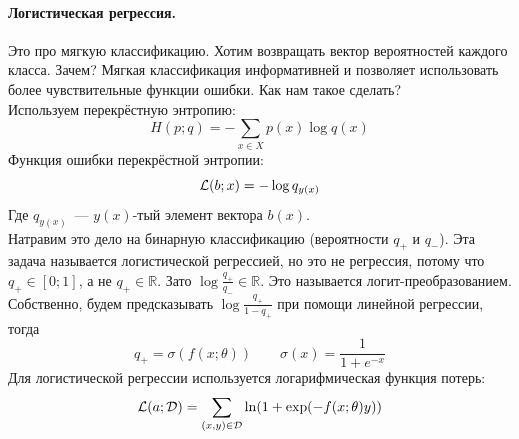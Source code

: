 \documentclass{article}
\begin{document}
    \paragraph{Логистическая регрессия.}
    Это про мягкую классификацию. Хотим возвращать вектор вероятностей каждого класса. Зачем? Мягкая классификация информативней и позволяет использовать более чувствительные функции ошибки. Как нам такое сделать?\\
    Используем перекрёстную энтропию:
    \[
    H(p;q)=-\sum\limits_{x\in X}p(x)\log q(x)
    \]
    Функция ошибки перекрёстной энтропии:
    \[
    {\mathcal{L}}(b;x)=-\log q_{y(x)}
    \]
    Где $q_{y(x)}$~--- $y(x)$-тый элемент вектора $b(x)$.\\
    Натравим это дело на бинарную классификацию (вероятности $q_+$ и $q_-$). Эта задача называется логистической регрессией, но это не регрессия, потому что $q_+\in[0;1]$, а не $q_+\in\mathbb R$. Зато $\log\frac{q_+}{q_-}\in\mathbb R$. Это называется логит-преобразованием.\\
    Собственно, будем предсказывать $\log\frac{q_+}{1-q_+}$ при помощи линейной регрессии, тогда
    \[
    q_+=\sigma(f(x;\theta))\qquad\sigma(x)=\frac1{1+e^{-x}}
    \]
    Для логистической регрессии используется логарифмическая функция потерь:
    \[
    {\mathcal{L}}(a;{\mathcal{D}})=\sum\limits_{(x,y)\in{\mathcal{D}}}\ln(1+\exp(-f(x;\theta)y))
    \]
\end{document}
